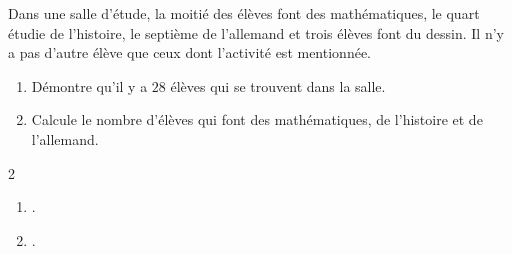 \begin{exercice*}
    Dans une salle d'étude, la moitié des élèves font des mathématiques, le quart étudie de
    l'histoire, le septième de l’allemand et trois élèves font du dessin. Il n'y a pas d’autre élève que ceux
    dont l'activité est mentionnée.
    \begin{enumerate}
        \item Démontre qu'il y a $28$ élèves qui se trouvent dans la salle.
        \item Calcule le nombre d'élèves qui font des mathématiques, de l'histoire et de l'allemand.
    \end{enumerate}
\end{exercice*}
\begin{corrige}
    \phantom{rrr}    
    \begin{multicols}2
        \begin{enumerate}
            \item .
            \item .
        \end{enumerate}
    \end{multicols}
\end{corrige}

